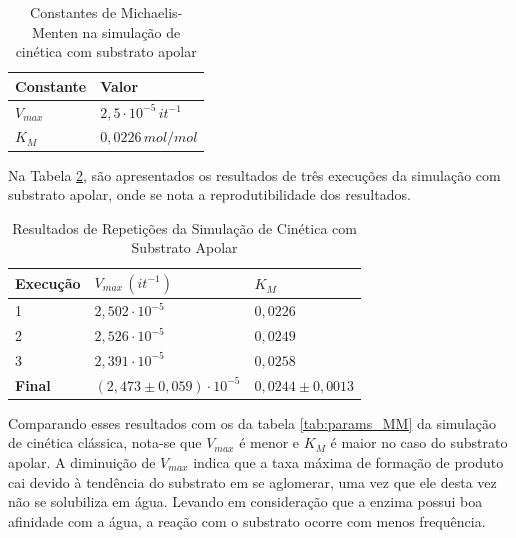 \documentclass[12pt,oneside]{report}
\begin{document}
\begin{table}[H]
    \centering
    \caption{Constantes de Michaelis-Menten na simulação de cinética com substrato apolar}
    \vspace{0.2cm}
    \begin{tabularx}{\textwidth}{X m{5cm}}
        \hline
        \textbf{Constante} & \textbf{Valor}                   \\
        \hline
        $V_{max}$          & $2{,}5 \cdot 10^{-5} \, it^{-1}$ \\
        $K_M$              & $0{,}0226 \, mol/mol$            \\
        \hline
    \end{tabularx}
    \vspace{0.2cm}
    \label{tab:params_MM_apolar}
\end{table}

Na Tabela \ref{tab:params_MM_apolar_repeticoes}, são apresentados os resultados de três execuções da simulação com substrato apolar, onde se nota a reprodutibilidade dos resultados.

\begin{table}[H]
    \centering
    \caption{Resultados de Repetições da Simulação de Cinética com Substrato Apolar}
    \vspace{0.2cm}
    \begin{tabularx}{\textwidth}{X X m{5cm}}
        \hline
        \textbf{Execução} & \textbf{$V_{max} \, (it^{-1})$ }      & \textbf{$K_M$}          \\
        \hline
        1                 & $2{,}502 \cdot 10^{-5}$               & $0{,}0226$              \\
        2                 & $2{,}526 \cdot 10^{-5}$               & $0{,}0249$              \\
        3                 & $2{,}391 \cdot 10^{-5}$               & $0{,}0258$              \\
        \hline
        \textbf{Final}    & $(2{,}473 \pm 0{,}059) \cdot 10^{-5}$ & $0{,}0244 \pm 0{,}0013$ \\
        \hline
    \end{tabularx}
    \vspace{0.2cm}
    \label{tab:params_MM_apolar_repeticoes}
\end{table}

Comparando esses resultados com os da tabela \ref{tab:params_MM} da simulação de cinética clássica, nota-se que $V_{max}$ é menor e $K_M$ é maior no caso do substrato apolar. A diminuição de $V_{max}$ indica que a taxa máxima de formação de produto cai devido à tendência do substrato em se aglomerar, uma vez que ele desta vez não se solubiliza em água. Levando em consideração que a enzima possui boa afinidade com a água, a reação com o substrato ocorre com menos frequência.
\end{document}
